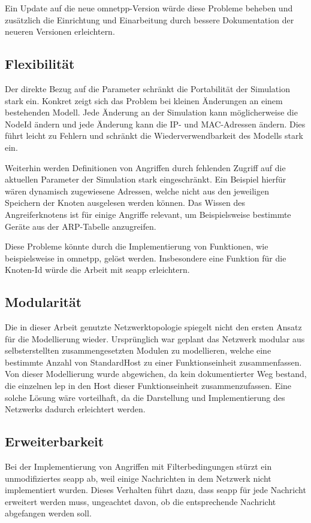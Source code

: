 Ein Update auf die neue \gls{omnetpp}-Version würde diese Probleme beheben und zusätzlich die Einrichtung und Einarbeitung durch bessere Dokumentation der neueren Versionen erleichtern.

\subsection{Flexibilität}\label{aus:Flexibilität}
Der direkte Bezug auf die Parameter schränkt die Portabilität der Simulation stark ein. Konkret zeigt sich das Problem bei kleinen Änderungen an einem bestehenden Modell. Jede Änderung an der Simulation kann möglicherweise die NodeId ändern und jede Änderung kann die IP- und MAC-Adressen ändern. Dies führt leicht zu Fehlern und schränkt die Wiederverwendbarkeit des Modells stark ein.

Weiterhin werden Definitionen von Angriffen durch fehlenden Zugriff auf die aktuellen Parameter der Simulation stark eingeschränkt. Ein Beispiel hierfür wären dynamisch zugewiesene Adressen, welche nicht aus den jeweiligen Speichern der Knoten ausgelesen werden können. Das Wissen des Angreiferknotens ist für einige Angriffe relevant, um Beispielsweise bestimmte Geräte aus der ARP-Tabelle anzugreifen.

Diese Probleme könnte durch die Implementierung von Funktionen, wie beispielsweise    in \gls{omnetpp}, gelöst werden. Insbesondere eine Funktion für die Knoten-Id würde die Arbeit mit \gls{seapp} erleichtern.

\subsection{Modularität}\label{aus:Modularität}
Die in dieser Arbeit genutzte Netzwerktopologie spiegelt nicht den ersten Ansatz für die Modellierung wieder. Ursprünglich war geplant das Netzwerk modular aus selbsterstellten zusammengesetzten Modulen zu modellieren, welche eine bestimmte Anzahl von StandardHost zu einer Funktionseinheit zusammenfassen. Von dieser Modellierung wurde abgewichen, da kein dokumentierter Weg bestand, die einzelnen \gls{lep} in den Host dieser Funktionseinheit zusammenzufassen. Eine solche Lösung wäre vorteilhaft, da die Darstellung und Implementierung des Netzwerks dadurch erleichtert werden.

\subsection{Erweiterbarkeit}\label{aus:Erweiterbarkeit}
Bei der Implementierung von Angriffen mit Filterbedingungen stürzt ein unmodifiziertes \gls{seapp} ab, weil einige Nachrichten in dem Netzwerk nicht implementiert wurden. Dieses Verhalten führt dazu, dass \gls{seapp} für jede Nachricht erweitert werden muss, ungeachtet davon, ob die entsprechende Nachricht abgefangen werden soll.


